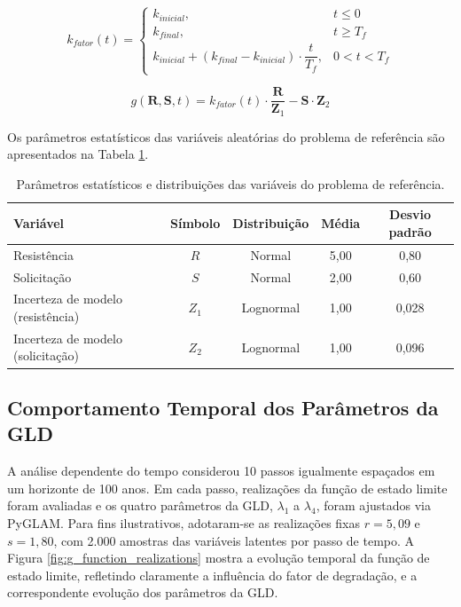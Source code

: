\begin{equation}\label{eq:k_factor_linear}
k_{fator}(t) =
\begin{cases}
k_{inicial}, & t \leq 0 \\[5pt]
k_{final}, & t \geq T_f \\[5pt]
k_{inicial} + (k_{final} - k_{inicial}) \cdot \dfrac{t}{T_f}, & 0 < t < T_f
\end{cases}
\end{equation}

\begin{equation}\label{eq:toy_problem_equation}
g(\mathbf{R}, \mathbf{S}, t) = k_{fator}(t) \cdot \frac{\mathbf{R}}{\mathbf{Z}_1} - \mathbf{S} \cdot \mathbf{Z}_2
\end{equation}

Os parâmetros estatísticos das variáveis aleatórias do problema de referência são apresentados na Tabela \ref{tab:random_variables_parameters}.

\begin{table}[H]
\centering
\caption{Parâmetros estatísticos e distribuições das variáveis do problema de referência.}
\label{tab:random_variables_parameters}
\begin{tabular}{l c c c c}
\toprule
\textbf{Variável} & \textbf{Símbolo} & \textbf{Distribuição} & \textbf{Média} & \textbf{Desvio padrão} \\
\midrule
Resistência                       & $R$   & Normal    & 5,00 & 0,80  \\
Solicitação                       & $S$   & Normal    & 2,00 & 0,60  \\
Incerteza de modelo (resistência) & $Z_1$ & Lognormal & 1,00 & 0,028 \\
Incerteza de modelo (solicitação) & $Z_2$ & Lognormal & 1,00 & 0,096 \\
\bottomrule
\end{tabular}
\vspace{0.2cm}
\end{table}

\subsection{Comportamento Temporal dos Parâmetros da GLD}

A análise dependente do tempo considerou 10 passos igualmente espaçados em um horizonte de 100 anos. Em cada passo, realizações da função de estado limite foram avaliadas e os quatro parâmetros da GLD, $\lambda_1$ a $\lambda_4$, foram ajustados via PyGLAM. Para fins ilustrativos, adotaram-se as realizações fixas $r = 5{,}09$ e $s = 1{,}80$, com 2.000 amostras das variáveis latentes por passo de tempo. A Figura \ref{fig:g_function_realizations} mostra a evolução temporal da função de estado limite, refletindo claramente a influência do fator de degradação, e a correspondente evolução dos parâmetros da GLD.

